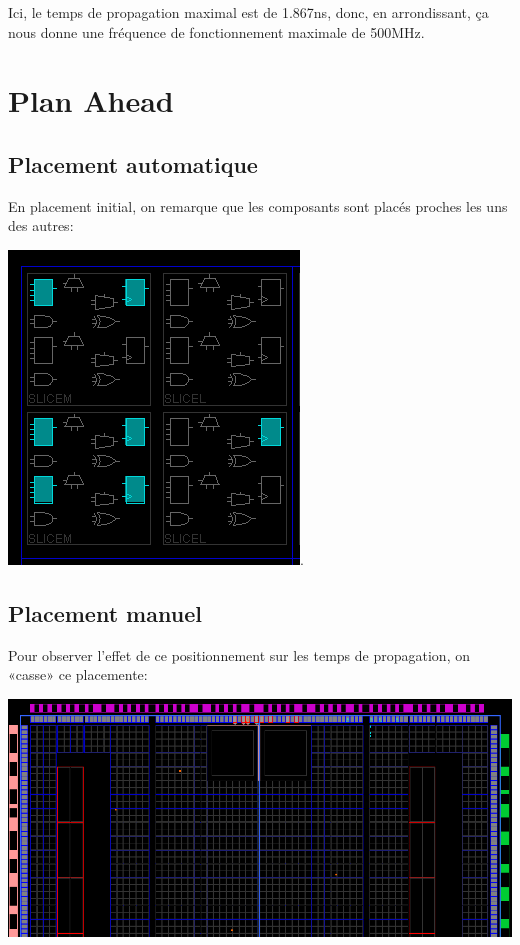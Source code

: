 \documentclass{article}
\begin{document}
Ici, le temps de propagation maximal est de 1.867ns, donc, en arrondissant, ça nous donne une
fréquence de fonctionnement maximale de 500MHz.

\section{Plan Ahead}
\subsection{Placement automatique}

En placement initial, on remarque que les composants sont placés proches les uns des autres:

\includegraphics{plan_ahead}.

\subsection{Placement manuel}

Pour observer l’effet de ce positionnement sur les temps de propagation, on «casse» ce placemente:

\includegraphics[width=\linewidth]{plan_ahead_casse}
\end{document}
